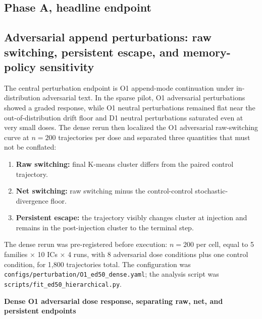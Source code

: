 \documentclass{article}
\theoremstyle{plain}
\theoremstyle{definition}
\begin{document}
\subsection*{Phase A, headline endpoint}

\subsection{Adversarial append perturbations: raw switching, persistent escape, and memory-policy sensitivity}

The central perturbation endpoint is O1 append-mode continuation under in-distribution adversarial text. In the sparse pilot, O1 adversarial perturbations showed a graded response, while O1 neutral perturbations remained flat near the out-of-distribution drift floor and D1 neutral perturbations saturated even at very small doses. The dense rerun then localized the O1 adversarial raw-switching curve at $n=200$ trajectories per dose and separated three quantities that must not be conflated:

\begin{enumerate}
  \item \textbf{Raw switching:} final K-means cluster differs from the paired control trajectory.
  \item \textbf{Net switching:} raw switching minus the control-control stochastic-divergence floor.
  \item \textbf{Persistent escape:} the trajectory visibly changes cluster at injection and remains in the post-injection cluster to the terminal step.
\end{enumerate}

The dense rerun was pre-registered before execution: $n=200$ per cell, equal to 5 families × 10 ICs × 4 runs, with 8 adversarial dose conditions plus one control condition, for 1,800 trajectories total. The configuration was \texttt{configs/perturbation/O1\_ed50\_dense.yaml}; the analysis script was \texttt{scripts/fit\_ed50\_hierarchical.py}.

\textbf{Dense O1 adversarial dose response, separating raw, net, and persistent endpoints}
\end{document}
